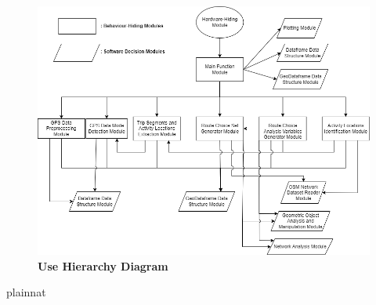 \documentclass[12pt, titlepage]{article}
\begin{document}
\begin{figure}[H]
\centering
 \centering
\includegraphics[scale=0.60]{UseHierarchy.png}
\caption{\bf Use Hierarchy Diagram}
\end{figure}

\newpage
 {plainnat}
% 


\newpage{}
\end{document}
